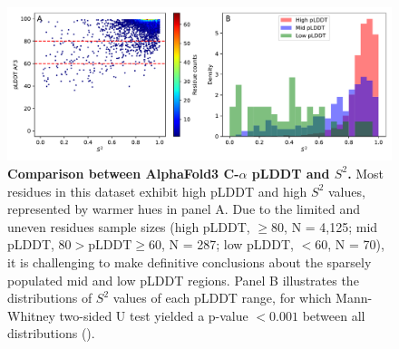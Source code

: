 \begin{figure}[H]
    \centering
    \includegraphics[width=\textwidth]{pLDDT/plddt_figures/s2_vs_plddt_af3_hexbin_undivided_hist.pdf}
    \caption{\textbf{Comparison between AlphaFold3 C-$\alpha$ pLDDT and \(S^{2}\).} Most residues in this dataset exhibit high pLDDT and high \(S^{2}\) values, represented by warmer hues in panel A. Due to the limited and uneven residues sample sizes (high pLDDT, \( \geq 80 \), N = 4,125; mid pLDDT, \( 80 > \text{pLDDT} \geq 60 \),  N = 287; low pLDDT, \( < 60 \), N = 70), it is challenging to make definitive conclusions about the sparsely populated mid and low pLDDT regions. Panel B illustrates the distributions of \(S^{2}\) values of each pLDDT range, for which Mann-Whitney two-sided U test yielded a p-value \( < 0.001 \) between all distributions ().}

    \label{fig:af3_plddt_vs_s2_undivided}
\end{figure}

